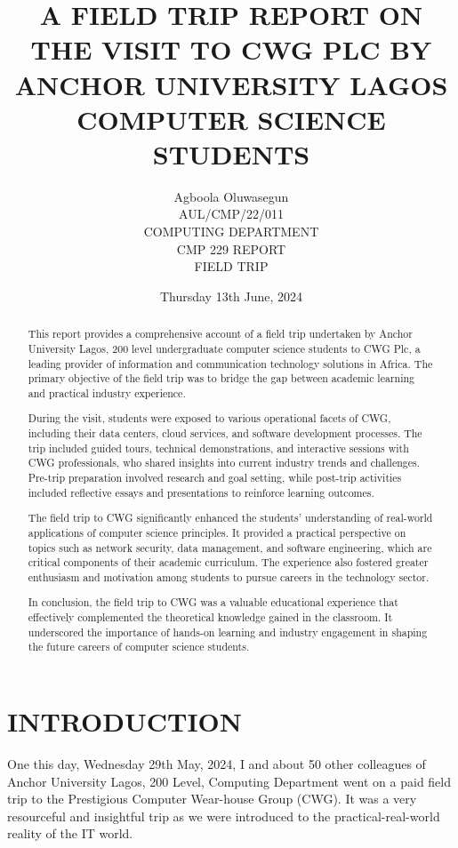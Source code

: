\documentclass[a4paper,12pt]{report}
\title{A FIELD TRIP REPORT ON THE VISIT TO CWG PLC BY ANCHOR UNIVERSITY LAGOS COMPUTER SCIENCE STUDENTS}
\author{Agboola Oluwasegun \\
        AUL/CMP/22/011 \\
        COMPUTING DEPARTMENT \\
        CMP 229 REPORT \\
        FIELD TRIP}
\date{Thursday 13th June, 2024}
\begin{document}
\maketitle

\tableofcontents


\begin{abstract}
    This report provides a comprehensive account of a field trip undertaken by Anchor University Lagos, 200 level undergraduate computer science students to CWG Plc, a leading provider of information and communication technology solutions in Africa. The primary objective of the field trip was to bridge the gap between academic learning and practical industry experience.

During the visit, students were exposed to various operational facets of CWG, including their data centers, cloud services, and software development processes. The trip included guided tours, technical demonstrations, and interactive sessions with CWG professionals, who shared insights into current industry trends and challenges. Pre-trip preparation involved research and goal setting, while post-trip activities included reflective essays and presentations to reinforce learning outcomes.

The field trip to CWG significantly enhanced the students' understanding of real-world applications of computer science principles. It provided a practical perspective on topics such as network security, data management, and software engineering, which are critical components of their academic curriculum. The experience also fostered greater enthusiasm and motivation among students to pursue careers in the technology sector.

In conclusion, the field trip to CWG was a valuable educational experience that effectively complemented the theoretical knowledge gained in the classroom. It underscored the importance of hands-on learning and industry engagement in shaping the future careers of computer science students.
\end{abstract}


\chapter[Chapter 1]{INTRODUCTION}
One this day, Wednesday 29th May, 2024, I and about 50 other colleagues of Anchor University Lagos, 200 Level, Computing Department went on a paid field trip to the Prestigious Computer Wear-house Group (CWG). It was a very resourceful and insightful trip as we were introduced to the practical-real-world reality of the IT world.
\end{document}
